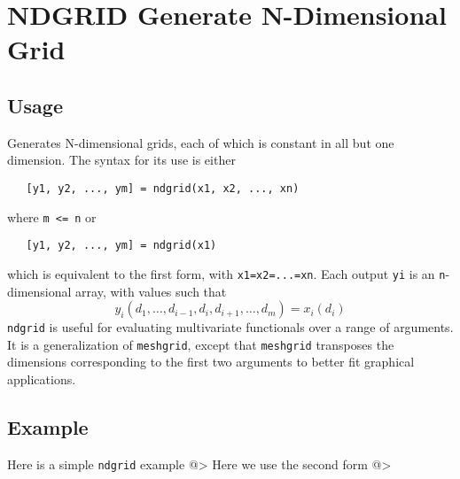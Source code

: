 \section{NDGRID Generate N-Dimensional Grid}

\subsection{Usage}

Generates N-dimensional grids, each of which is constant in all but
one dimension.  The syntax for its use is either
\begin{verbatim}
   [y1, y2, ..., ym] = ndgrid(x1, x2, ..., xn)
\end{verbatim}
where \verb|m <= n| or 
\begin{verbatim}
   [y1, y2, ..., ym] = ndgrid(x1)
\end{verbatim}
which is equivalent to the first form, with \verb|x1=x2=...=xn|.  Each
output \verb|yi| is an \verb|n|-dimensional array, with values such that
\[
y_i(d_1,\ldots,d_{i-1},d_{i},d_{i+1},\ldots,d_m) = x_i(d_{i})
\]
\verb|ndgrid| is useful for evaluating multivariate functionals over a
range of arguments.  It is a generalization of \verb|meshgrid|, except
that \verb|meshgrid| transposes the dimensions corresponding to the 
first two arguments to better fit graphical applications.
\subsection{Example}

Here is a simple \verb|ndgrid| example
@>
Here we use the second form
@>
